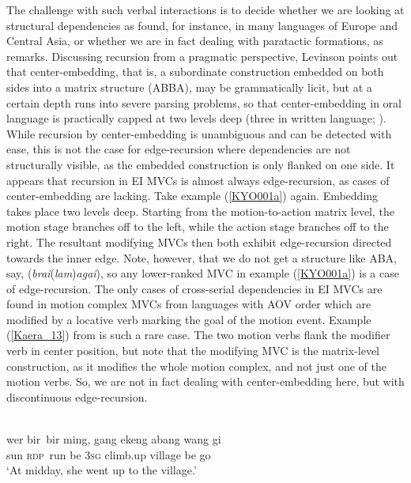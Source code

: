 The challenge with such verbal interactions is to decide whether we are looking at structural dependencies as found, for instance, in many languages of Europe and Central Asia, or whether we are in fact dealing with paratactic formations, as \citep[151]{levinson2013recursion} remarks. Discussing recursion from a pragmatic perspective, Levinson points out that center-embedding, that is, a subordinate construction embedded on both sides into a matrix structure (ABBA), may be grammatically licit, but at a certain depth runs into severe parsing problems, so that center-embedding in oral language is practically capped at two levels deep (three in written language; \citealt[154]{levinson2013recursion}). While recursion by center-embedding is unambiguous and can be detected with ease, this is not the case for edge-recursion where dependencies are not structurally visible, as the embedded construction is only flanked on one side. It appears that recursion in EI MVCs is almost always edge-recursion, as cases of center-embedding are lacking. Take example (\ref{KYO001a}) again. Embedding takes place two levels deep. Starting from the motion-to-action matrix level, the motion stage branches off to the left, while the action stage branches off to the right. The resultant modifying MVCs then both exhibit edge-recursion directed towards the inner edge. Note, however, that we do not get a structure like ABA, say, (\textit{brai}(\textit{lam})\textit{agai}), so any lower-ranked MVC in example (\ref{KYO001a}) is a case of edge-recursion. The only cases of cross-serial dependencies in EI MVCs are found in motion complex MVCs from languages with AOV order which are modified by a locative verb marking the goal of the motion event. Example (\ref{Kaera_13}) from  is such a rare case. The two motion verbs flank the modifier verb in center position, but note that the modifying MVC is the matrix-level construction, as it modifies the whole motion complex, and not just one of the motion verbs. So, we are not in fact dealing with center-embedding here, but with discontinuous edge-recursion.

\ea \label{Kaera_13}
\\
\gll wer bir~bir ming, gang ekeng abang wang gi \\
sun \textsc{rdp}~run be 3\textsc{sg} climb.up village be go \\
\glft `At midday, she went up to the village.'\\ 
\z

